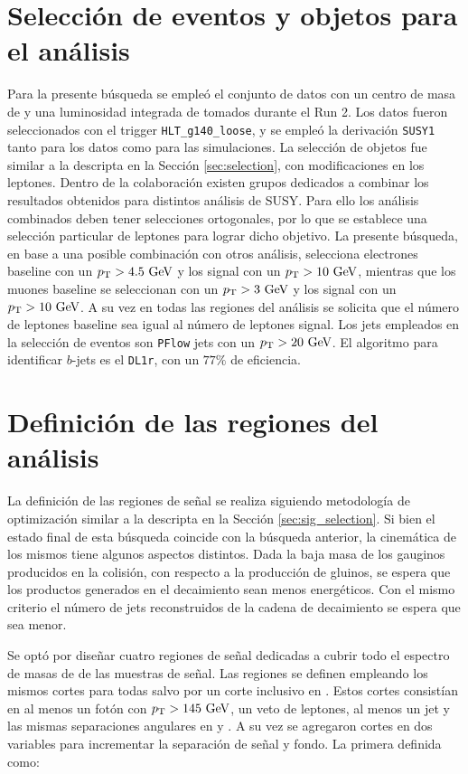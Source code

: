 \section{Selección de eventos y objetos para el análisis}

Para la presente búsqueda se empleó el conjunto de datos con un centro de masa de  y una luminosidad integrada de  tomados durante el Run 2. Los datos fueron seleccionados con el trigger \texttt{HLT\_g140\_loose}, y se empleó la derivación \texttt{SUSY1} tanto para los datos como para las simulaciones. La selección de objetos fue similar a la descripta en la Sección \ref{sec:selection}, con modificaciones en los leptones. Dentro de la colaboración existen grupos dedicados a combinar los resultados obtenidos para distintos análisis de SUSY. Para ello los análisis combinados deben tener selecciones ortogonales, por lo que se establece una selección particular de leptones para lograr dicho objetivo. La presente búsqueda, en base a una posible combinación con otros análisis, selecciona electrones baseline con un $p_{\text{T}}>4.5\ \text{GeV}$ y los signal con un $\pt>10 \ \gev$, mientras que los muones baseline se seleccionan con un $\pt>3\ \gev$ y los signal con un $\pt>10\ \gev$. A su vez en todas las regiones del análisis se solicita que el número de leptones baseline sea igual al número de leptones signal. Los jets empleados en la selección de eventos son \texttt{PFlow} jets con un $\pt>20\ \gev$. El algoritmo para identificar $b$-jets es el \texttt{DL1r}, con un $77\%$ de eficiencia.



\section{Definición de las regiones del análisis}

La definición de las regiones de señal se realiza siguiendo metodología de optimización similar a la descripta en la Sección \ref{sec:sig_selection}.
Si bien el estado final de esta búsqueda coincide con la búsqueda anterior, la cinemática de los mismos tiene algunos aspectos distintos. Dada la baja masa de los gauginos producidos en la colisión, con respecto a la producción de gluinos, se espera que los productos generados en el decaimiento sean menos energéticos. Con el mismo criterio el número de jets reconstruidos de la cadena de decaimiento se espera que sea menor.

Se optó por diseñar cuatro regiones de señal dedicadas a cubrir todo el espectro de masas de \ninoone de las muestras de señal. Las regiones se definen empleando los mismos cortes para todas salvo por un corte inclusivo en \met. Estos cortes consistían en al menos un fotón con $p_{\text{T}}>145\ \text{GeV}$, un veto de leptones, al menos un jet y las mismas separaciones angulares en \dphijetmet y \dphigammet. A su vez se agregaron cortes en dos variables para incrementar la separación de señal y fondo. La primera definida como:


